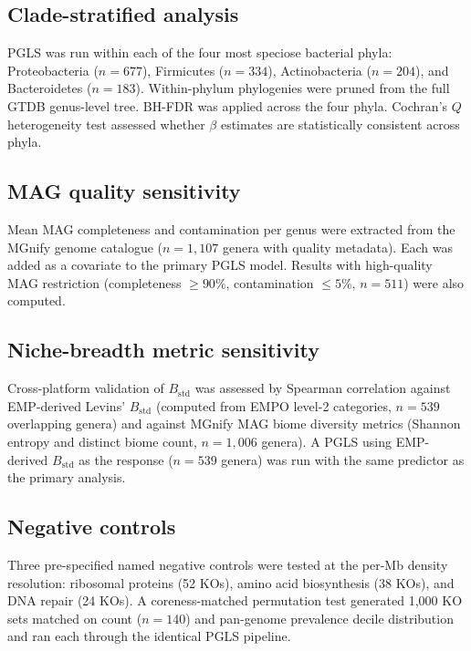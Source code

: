 \documentclass[times]{zHenriquesLab-StyleBioRxiv}
\begin{document}
\subsection{Clade-stratified analysis}

PGLS was run within each of the four most speciose bacterial phyla:
Proteobacteria ($n = 677$), Firmicutes ($n = 334$), Actinobacteria ($n = 204$),
and Bacteroidetes ($n = 183$). Within-phylum phylogenies were pruned from the
full GTDB genus-level tree. BH-FDR was applied across the four phyla. Cochran's
$Q$ heterogeneity test assessed whether $\beta$ estimates are statistically
consistent across phyla.

\subsection{MAG quality sensitivity}

Mean MAG completeness and contamination per genus were extracted from
the MGnify genome catalogue ($n = 1{,}107$ genera with quality metadata).
Each was added as a covariate to the primary PGLS model. Results with
high-quality MAG restriction (completeness $\geq 90\%$, contamination $\leq
5\%$, $n = 511$) were also computed.

\subsection{Niche-breadth metric sensitivity}

Cross-platform validation of $B_\mathrm{std}$ was assessed by Spearman
correlation against EMP-derived Levins' $B_\mathrm{std}$ (computed from EMPO
level-2 categories, $n = 539$ overlapping genera) and against MGnify MAG biome
diversity metrics (Shannon entropy and distinct biome count, $n = 1{,}006$
genera). A PGLS using EMP-derived $B_\mathrm{std}$ as the response ($n = 539$
genera) was run with the same predictor as the primary analysis.

\subsection{Negative controls}

Three pre-specified named negative controls were tested at the per-Mb density
resolution: ribosomal proteins (52 KOs), amino acid biosynthesis (38 KOs), and
DNA repair (24 KOs). A coreness-matched permutation test generated 1,000 KO sets
matched on count ($n = 140$) and pan-genome prevalence decile distribution and
ran each through the identical PGLS pipeline.
\end{document}
